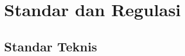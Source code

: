 \documentclass{elsinta}
\begin{document}
\section{Standar dan Regulasi}

\subsection{Standar Teknis}


\end{document}
